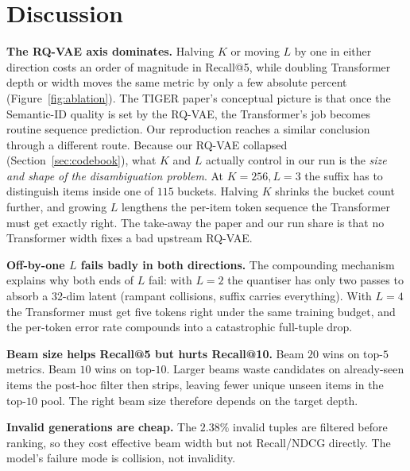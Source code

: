 \documentclass[sigconf]{acmart}
\begin{document}
\section{Discussion}
\label{sec:discussion}

\textbf{The RQ-VAE axis dominates.}  Halving $K$ or moving $L$ by
one in either direction costs an order of magnitude in Recall@5,
while doubling Transformer depth or width moves the same metric by
only a few absolute percent (Figure~\ref{fig:ablation}).  The TIGER
paper's conceptual picture is that once the Semantic-ID quality is
set by the RQ-VAE, the Transformer's job becomes routine sequence
prediction.  Our reproduction reaches a similar conclusion through a
different route.  Because our RQ-VAE collapsed
(Section~\ref{sec:codebook}), what $K$ and $L$ actually control in
our run is the \emph{size and shape of the disambiguation problem}.
At $K{=}256, L{=}3$ the suffix has to distinguish items inside one
of $115$ buckets. Halving $K$ shrinks the bucket count further, and
growing $L$ lengthens the per-item token sequence the Transformer
must get exactly right.  The take-away the paper and our run share is
that no Transformer width fixes a bad upstream RQ-VAE.

\textbf{Off-by-one $L$ fails badly in both directions.}  The compounding
mechanism explains why both ends of $L$ fail: with $L{=}2$ the
quantiser has only two passes to absorb a 32-dim latent (rampant
collisions, suffix carries everything). With $L{=}4$ the Transformer
must get five tokens right under the same training budget, and the
per-token error rate compounds into a catastrophic full-tuple drop.

\textbf{Beam size helps Recall@5 but hurts Recall@10.}  Beam $20$
wins on top-$5$ metrics. Beam $10$ wins on top-$10$.  Larger
beams waste candidates on already-seen items the post-hoc filter
then strips, leaving fewer unique unseen items in the top-$10$ pool.
The right beam size therefore depends on the target depth.

\textbf{Invalid generations are cheap.}  The $2.38\%$ invalid tuples
are filtered before ranking, so they cost effective beam width but
not Recall/NDCG directly. The model's failure mode is collision,
not invalidity.
\end{document}
